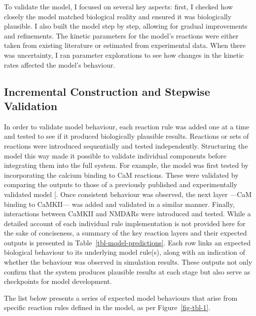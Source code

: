 \documentclass[
  11pt,
  letterpaper,
]{scrreprt}
\begin{document}
To validate the model, I focused on several key aspects: first, I
checked how closely the model matched biological reality and ensured it
was biologically plausible. I also built the model step by step,
allowing for gradual improvements and refinements. The kinetic
parameters for the model's reactions were either taken from existing
literature or estimated from experimental data. When there was
uncertainty, I ran parameter explorations to see how changes in the
kinetic rates affected the model's behaviour.

\subsection{Incremental Construction and Stepwise
Validation}\label{incremental-construction-and-stepwise-validation}

In order to validate model behaviour, each reaction rule was added one
at a time and tested to see if it produced biologically plausible
results. Reactions or sets of reactions were introduced sequentially and
tested independently. Structuring the model this way made it possible to
validate individual components before integrating them into the full
system. For example, the model was first tested by incorporating the
calcium binding to CaM reactions. These were validated by comparing the
outputs to those of a previously published and experimentally validated
model {[}\citeproc{ref-romangarcia2017Computationala}{471}{]}. Once
consistent behaviour was observed, the next layer ---CaM binding to
CaMKII--- was added and validated in a similar manner. Finally,
interactions between CaMKII and NMDARs were introduced and tested. While
a detailed account of each individual rule implementation is not
provided here for the sake of conciseness, a summary of the key reaction
layers and their expected outputs is presented in
Table~\ref{tbl-model-predictions}. Each row links an expected biological
behaviour to its underlying model rule(s), along with an indication of
whether the behaviour was observed in simulation results. These outputs
not only confirm that the system produces plausible results at each
stage but also serve as checkpoints for model development.

The list below presents a series of expected model behaviours that arise
from specific reaction rules defined in the model, as per
Figure~\ref{fig-tbl-1}.
\end{document}
